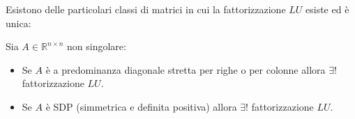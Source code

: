 %


Esistono delle particolari classi di matrici in cui la fattorizzazione $\displaystyle LU$ esiste ed è unica:
\begin{theorem}
Sia $\displaystyle A\in \mathbb{R}^{n\times n}$ non singolare:
\begin{itemize}
\item Se $\displaystyle A$ è a predominanza diagonale stretta per righe o per colonne allora $\displaystyle \exists !$ fattorizzazione $\displaystyle LU$.
\item Se $\displaystyle A$ è SDP (simmetrica e definita positiva) allora $\displaystyle \exists !$ fattorizzazione $\displaystyle LU$.
\end{itemize}
\label{thm:CS-LU}
\end{theorem}

